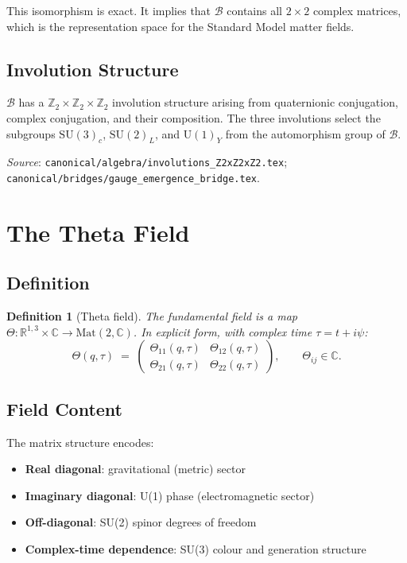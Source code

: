 \documentclass[12pt,a4paper]{article}
\newtheorem{definition}[theorem]{Definition}
\begin{document}
This isomorphism is exact.  It implies that $\mathcal{B}$ contains all
$2\times 2$ complex matrices, which is the representation space for the
Standard Model matter fields.

\subsection{Involution Structure}

$\mathcal{B}$ has a $\mathbb{Z}_2\times\mathbb{Z}_2\times\mathbb{Z}_2$
involution structure arising from quaternionic conjugation, complex conjugation,
and their composition.  The three involutions select the subgroups
$\mathrm{SU}(3)_c$, $\mathrm{SU}(2)_L$, and $\mathrm{U}(1)_Y$ from the
automorphism group of $\mathcal{B}$.

\textit{Source}: \texttt{canonical/algebra/involutions\_Z2xZ2xZ2.tex};
\texttt{canonical/bridges/gauge\_emergence\_bridge.tex}.

\section{The Theta Field}
\label{sec:field}

\subsection{Definition}

\begin{definition}[Theta field]
The fundamental field is a map
$\Theta : \mathbb{R}^{1,3}\times\mathbb{C} \to \mathrm{Mat}(2,\mathbb{C})$.
In explicit form, with complex time $\tau = t+i\psi$:
\begin{equation}
  \Theta(q,\tau) \;=\;
  \begin{pmatrix}
    \Theta_{11}(q,\tau) & \Theta_{12}(q,\tau) \\
    \Theta_{21}(q,\tau) & \Theta_{22}(q,\tau)
  \end{pmatrix}, \qquad
  \Theta_{ij} \in \mathbb{C}.
\end{equation}
\end{definition}

\subsection{Field Content}

The matrix structure encodes:
\begin{itemize}
  \item \textbf{Real diagonal}: gravitational (metric) sector
  \item \textbf{Imaginary diagonal}: U(1) phase (electromagnetic sector)
  \item \textbf{Off-diagonal}: SU(2) spinor degrees of freedom
  \item \textbf{Complex-time dependence}: SU(3) colour and generation structure
\end{itemize}
\end{document}
